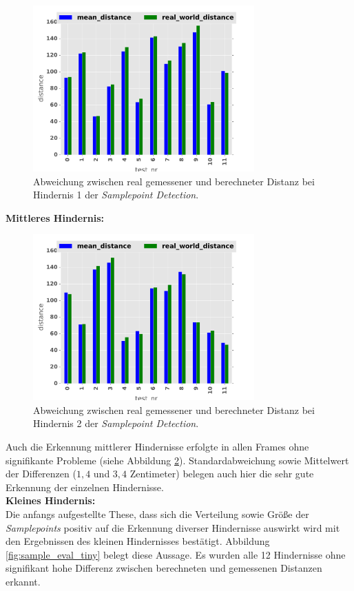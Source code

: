 \begin{figure}[h]
	\centering
	\includegraphics[width=8.5cm]{img/evaluation/diagrams/sample_big_bar}
	\caption{Abweichung zwischen real gemessener und berechneter Distanz bei Hindernis 1 der \emph{Samplepoint Detection}.}
    \label{fig:sample_eval_big}
\end{figure}

\pagebreak
\noindent
\textbf{Mittleres Hindernis:}

\begin{figure}[h]
	\centering
	\includegraphics[width=8.5cm]{img/evaluation/diagrams/sample_medium_bar}
	\caption{Abweichung zwischen real gemessener und berechneter Distanz bei Hindernis 2 der \emph{Samplepoint Detection}.}
    \label{fig:sample_eval_medium}
\end{figure}

\noindent
Auch die Erkennung mittlerer Hindernisse erfolgte in allen Frames ohne signifikante Probleme (siehe Abbildung \ref{fig:sample_eval_medium}). Standardabweichung sowie Mittelwert der Differenzen ($1,4$ und $3,4$ Zentimeter) belegen auch hier die sehr gute Erkennung der einzelnen Hindernisse.\\

\pagebreak
\noindent
\textbf{Kleines Hindernis:}\\
Die anfangs aufgestellte These, dass sich die Verteilung sowie Größe der \emph{Samplepoints} positiv auf die Erkennung diverser Hindernisse auswirkt wird mit den Ergebnissen des kleinen Hindernisses bestätigt. Abbildung \ref{fig:sample_eval_tiny} belegt diese Aussage. Es wurden alle 12 Hindernisse ohne signifikant hohe Differenz zwischen berechneten und gemessenen Distanzen erkannt.

